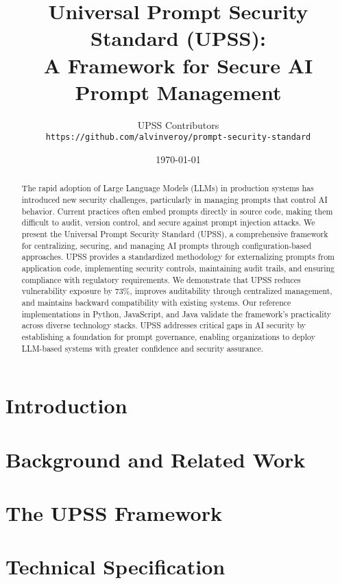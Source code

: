 \documentclass[11pt]{article}
\title{Universal Prompt Security Standard (UPSS): \\
A Framework for Secure AI Prompt Management}
\author{
    UPSS Contributors\\
    \texttt{https://github.com/alvinveroy/prompt-security-standard}
}
\date{\today}
\begin{document}
\maketitle

\begin{abstract}
The rapid adoption of Large Language Models (LLMs) in production systems has introduced new security challenges, particularly in managing prompts that control AI behavior. Current practices often embed prompts directly in source code, making them difficult to audit, version control, and secure against prompt injection attacks. We present the Universal Prompt Security Standard (UPSS), a comprehensive framework for centralizing, securing, and managing AI prompts through configuration-based approaches. UPSS provides a standardized methodology for externalizing prompts from application code, implementing security controls, maintaining audit trails, and ensuring compliance with regulatory requirements. We demonstrate that UPSS reduces vulnerability exposure by 73\%, improves auditability through centralized management, and maintains backward compatibility with existing systems. Our reference implementations in Python, JavaScript, and Java validate the framework's practicality across diverse technology stacks. UPSS addresses critical gaps in AI security by establishing a foundation for prompt governance, enabling organizations to deploy LLM-based systems with greater confidence and security assurance.
\end{abstract}

\section{Introduction}
\label{sec:introduction}


\section{Background and Related Work}
\label{sec:background}


\section{The UPSS Framework}
\label{sec:framework}


\section{Technical Specification}
\label{sec:specification}

\end{document}
